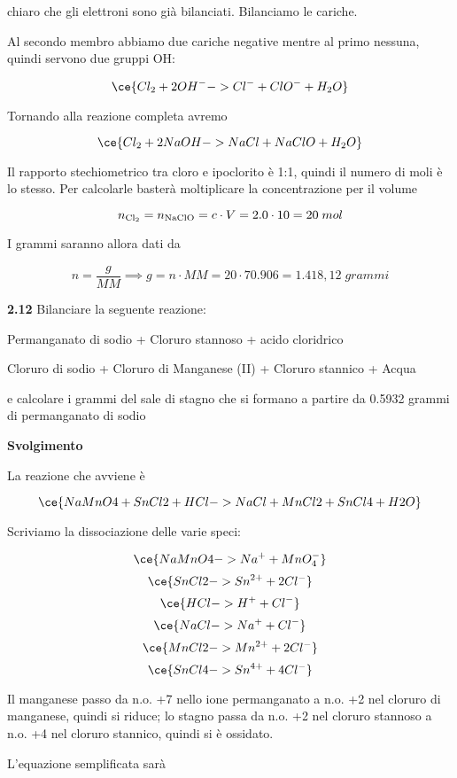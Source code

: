 \E chiaro che gli elettroni sono già bilanciati. Bilanciamo le cariche.

Al secondo membro abbiamo due cariche negative mentre al primo nessuna, quindi servono due gruppi OH:

$$\ce{Cl_2 + 2OH^- -> Cl^- + ClO^- + H_2O}$$

Tornando alla reazione completa avremo

$$\ce{Cl_2 + 2NaOH -> NaCl + NaClO + H_2O}$$

Il rapporto stechiometrico tra cloro e ipoclorito è 1:1, quindi il numero di moli è lo stesso. Per calcolarle basterà moltiplicare la concentrazione per il volume

$$n_{\rm Cl_2}=n_{\rm NaClO}=c \cdot V=2.0 \cdot 10=20\;mol$$

I grammi saranno allora dati da

$$n=\frac{g}{MM} \implies g=n \cdot MM=20 \cdot 70.906=1.418,12\;grammi$$

\vspace{0.2cm}\textbf{2.12} Bilanciare la seguente reazione:

\begin{center}
    Permanganato di sodio + Cloruro stannoso + acido cloridrico \ce{->}

    \ce{->} Cloruro di sodio + Cloruro di Manganese (II) + Cloruro stannico + Acqua
\end{center}

e calcolare i grammi del sale di stagno che si formano a partire da 0.5932 grammi di permanganato di sodio

\vspace{0.2cm}\large\textbf{Svolgimento}\normalsize

\vspace{0.2cm}La reazione che avviene è

$$\ce{NaMnO4 + SnCl2 + HCl -> NaCl + MnCl2 + SnCl4 + H2O}$$

Scriviamo la dissociazione delle varie speci:

$$\ce{NaMnO4 -> Na^+ + MnO_4^-}$$
$$\ce{SnCl2 -> Sn^{2+} + 2Cl^-}$$
$$\ce{HCl -> H^+ + Cl^-}$$
$$\ce{NaCl -> Na^+ + Cl^-}$$
$$\ce{MnCl2 -> Mn^{2+} + 2Cl^-}$$
$$\ce{SnCl4 -> Sn^{4+} + 4Cl^-}$$

Il manganese passo da n.o. +7 nello ione permanganato a n.o. +2 nel cloruro di
manganese, quindi si riduce; lo stagno passa da n.o. +2 nel cloruro stannoso a n.o. +4 nel cloruro stannico, quindi si è ossidato.

L'equazione semplificata sarà

